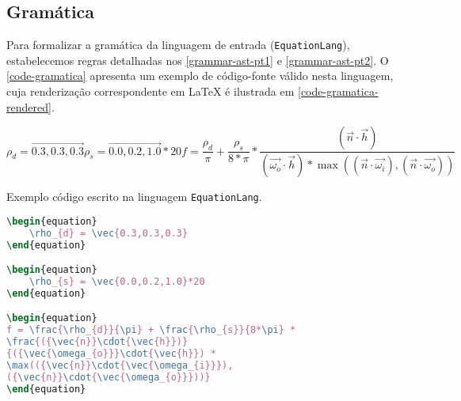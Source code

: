 \subsection{Gramática}

Para formalizar a gramática da linguagem de entrada (\texttt{EquationLang}), estabelecemos regras detalhadas nos \autoref{grammar-ast-pt1} e \autoref{grammar-ast-pt2}. O \autoref{code-gramatica} apresenta um exemplo de código-fonte válido nesta linguagem, cuja renderização correspondente em \LaTeX{} é ilustrada em \autoref{code-gramatica-rendered}.

\label{code-gramatica-rendered} \begin{subequations}
\begin{equation}
    \rho_{d} = \vec{0.3,0.3,0.3}
\end{equation}
\begin{equation}
    \rho_{s} = \vec{0.0,0.2,1.0}*20
\end{equation}
\begin{equation}
f = \frac{\rho_{d}}{\pi} + \frac{\rho_{s}}{8*\pi} *
\frac{({\vec{n}}\cdot{\vec{h}})}
{({\vec{\omega_{o}}}\cdot{\vec{h}}) *
\max(({\vec{n}}\cdot{\vec{\omega_{i}}}),
({\vec{n}}\cdot{\vec{\omega_{o}}}))}
\end{equation}
\end{subequations}


\begin{codigo}[htb]
        \caption{\small Exemplo código escrito na linguagem \texttt{EquationLang}. }
        \label{code-gramatica}
\begin{lstlisting}[language=tex, frame=none]
\begin{equation}
    \rho_{d} = \vec{0.3,0.3,0.3}
\end{equation}

\begin{equation}
    \rho_{s} = \vec{0.0,0.2,1.0}*20
\end{equation}

\begin{equation}
f = \frac{\rho_{d}}{\pi} + \frac{\rho_{s}}{8*\pi} *
\frac{({\vec{n}}\cdot{\vec{h}})}
{({\vec{\omega_{o}}}\cdot{\vec{h}}) *
\max(({\vec{n}}\cdot{\vec{\omega_{i}}}),
({\vec{n}}\cdot{\vec{\omega_{o}}}))}
\end{equation}

\end{lstlisting}
\end{codigo}

